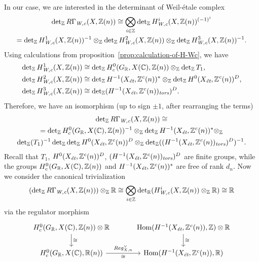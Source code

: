 \documentclass{article}
\numberwithin{equation}{section}
\begin{document}
In our case, we are interested in the determinant of Weil-étale complex
\begin{multline*}
  \det_\ZZ R\Gamma_\Wc (X, \ZZ(n)) \cong
  \bigotimes_{i \in \ZZ} \det_\ZZ H^i_\Wc (X, \ZZ(n))^{(-1)^i} \\
  =
  \det_\ZZ H^1_\Wc (X, \ZZ(n))^{-1} \otimes_\ZZ
  \det_\ZZ H^2_\Wc (X, \ZZ(n)) \otimes_\ZZ
  \det_\ZZ H^3_\Wc (X, \ZZ(n))^{-1}.
\end{multline*}
Using calculations from proposition~\ref{prop:calculation-of-H-Wc}, we have
\begin{align*}
  \det_\ZZ H^1_\Wc (X, \ZZ(n)) & \cong \det_\ZZ H^0_c (G_\RR, X(\CC), \ZZ(n)) \otimes_\ZZ \det_\ZZ T_1, \\
  \det_\ZZ H^2_\Wc (X, \ZZ(n)) & \cong \det_\ZZ H^{-1} (X_\et, \ZZ^c(n))^* \otimes_\ZZ \det_\ZZ H^0 (X_\et, \ZZ^c(n))^D, \\
  \det_\ZZ H^3_\Wc (X, \ZZ(n)) & \cong \det_\ZZ (H^{-1} (X_\et, \ZZ^c(n))_\tors)^D.
\end{align*}
Therefore, we have an isomorphism (up to sign $\pm 1$, after rearranging the
terms)
\begin{multline*}
  \det_\ZZ R\Gamma_\Wc (X, \ZZ(n)) \cong \\
  =
  \det_\ZZ H^0_c (G_\RR, X(\CC), \ZZ(n))^{-1} \otimes_\ZZ
  \det_\ZZ H^{-1} (X_\et, \ZZ^c(n))^* \otimes_\ZZ \\
  \det_\ZZ (T_1)^{-1} \det_\ZZ  \det_\ZZ H^0 (X_\et, \ZZ^c(n))^D \otimes_\ZZ \det_\ZZ ((H^{-1} (X_\et, \ZZ^c(n))_\tors)^D)^{-1}.
\end{multline*}
Recall that $T_1$, $H^0 (X_\et, \ZZ^c(n))^D$,
$(H^{-1} (X_\et, \ZZ^c(n))_\tors)^D$ are finite groups, while the groups
$H^0_c (G_\RR, X(\CC), \ZZ(n))$ and $H^{-1} (X_\et, \ZZ^c(n))^*$ are free of
rank $d_n$. Now we consider the canonical trivialization
\[ (\det_\ZZ R\Gamma_\Wc (X, \ZZ(n))) \otimes_\ZZ \RR \cong
  \bigotimes_{i\in \ZZ} \det_\RR (H^i_\Wc (X, \ZZ(n))\otimes_\ZZ \RR)
  \cong \RR \]
via the regulator morphism
\[ \begin{tikzcd}[column sep=3em]
    H^0_c (G_\RR, X(\CC), \ZZ(n)) \otimes \RR\ar{d}{\cong} & \Hom (H^{-1} (X_\et, \ZZ^c (n)), \ZZ) \otimes \RR\ar{d}{\cong} \\
    H^0_c (G_\RR, X(\CC), \RR (n)) \ar{r}{Reg^\vee_{X,n}}[swap]{\cong} & \Hom (H^{-1} (X_\et, \ZZ^c (n)), \RR)
  \end{tikzcd} \]
\end{document}
